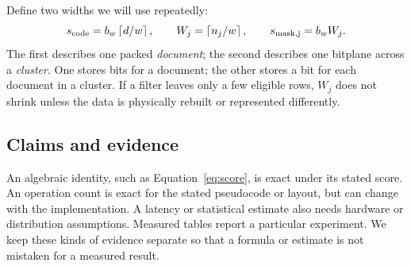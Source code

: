 Define two widths we will use repeatedly:
\begin{equation}
s_{\rm code}=b_w\left\lceil d/w\right\rceil,\qquad
W_j=\left\lceil n_j/w\right\rceil,\qquad s_{\rm mask,j}=b_w W_j.
\label{eq:widths}
\end{equation}
The first describes one packed \emph{document}; the second describes one bitplane across a
\emph{cluster}. One stores bits for a document; the other stores a bit for each document in a cluster. If a filter leaves only a few eligible rows,
$W_j$ does not shrink unless the data is physically rebuilt or represented differently.

\subsection{Claims and evidence}
An algebraic identity, such as Equation~\eqref{eq:score}, is exact under its stated score.
An operation count is exact for the stated pseudocode or layout, but can change with the
implementation. A latency or statistical estimate also needs hardware or distribution
assumptions. Measured tables report a particular experiment. We keep these kinds of evidence separate so that a formula or estimate is not mistaken for
a measured result.
